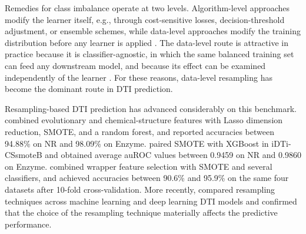\documentclass[10pt,a4paper]{article}
\begin{document}
Remedies for class imbalance operate at two levels. Algorithm-level
approaches modify the learner itself, e.g., through cost-sensitive
losses, decision-threshold adjustment, or ensemble schemes, while
data-level approaches modify the training distribution before any
learner is applied \citep{mohammed2020machine, devi2020review}. The
data-level route is attractive in practice because it is
classifier-agnostic, in which the same balanced training set can feed
any downstream model, and because its effect can be examined
independently of the learner \citep{kim2022empirical}. For these
reasons, data-level resampling has become the dominant route in DTI
prediction.

Resampling-based DTI prediction has advanced considerably on this
benchmark. \citet{shi2019predicting} combined evolutionary and
chemical-structure features with Lasso dimension reduction, SMOTE, and a
random forest, and reported accuracies between 94.88\% on NR and
98.09\% on Enzyme. \citet{mahmud2019idti} paired SMOTE with XGBoost in
iDTi-CSsmoteB and obtained average auROC values between 0.9459 on NR and
0.9860 on Enzyme. \citet{redkar2020machine} combined wrapper feature
selection with SMOTE and several classifiers, and achieved accuracies
between 90.6\% and 95.9\% on the same four datasets after 10-fold
cross-validation. More recently, \citet{azlimkhan2023comparative}
compared resampling techniques across machine learning and deep learning
DTI models and confirmed that the choice of the resampling technique
materially affects the predictive performance.
\end{document}
